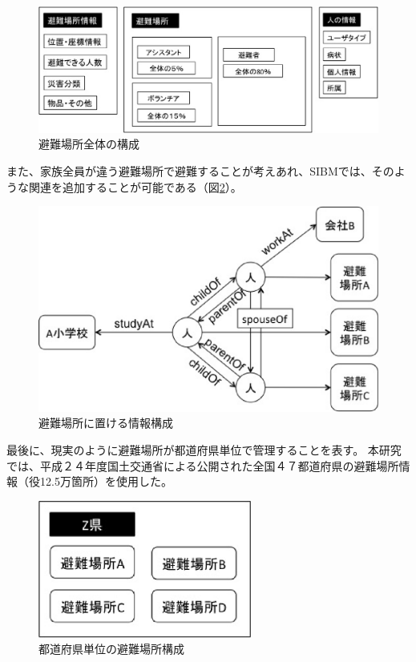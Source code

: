 \begin{figure}[h!]
 	\begin{center}
 		\includegraphics[width=135mm]{./images/sibm_fullimage.eps}
 		\caption{避難場所全体の構成}
 		\label{fig:sibm_shelter}
 	\end{center}
\end{figure}

また、家族全員が違う避難場所で避難することが考えあれ、SIBMでは、そのような関連を追加することが可能である（図\ref{fig:sibm_relationship}）。

\begin{figure}[h!]
 	\begin{center}
 		\includegraphics[width=135mm]{./images/sibm_relation.eps}
 		\caption{避難場所に置ける情報構成}
 		\label{fig:sibm_relationship}
 	\end{center}
\end{figure}

最後に、現実のように避難場所が都道府県単位で管理することを表す。
本研究では、平成２４年度国土交通省による公開された全国４７都道府県の避難場所情報（役12.5万箇所）を使用した。

\begin{figure}[h!]
 	\begin{center}
 		\includegraphics[width=70mm]{./images/sibm_prefecture.eps}
 		\caption{都道府県単位の避難場所構成}
 		\label{fig:sibm_prefecture}
 	\end{center}
\end{figure}

